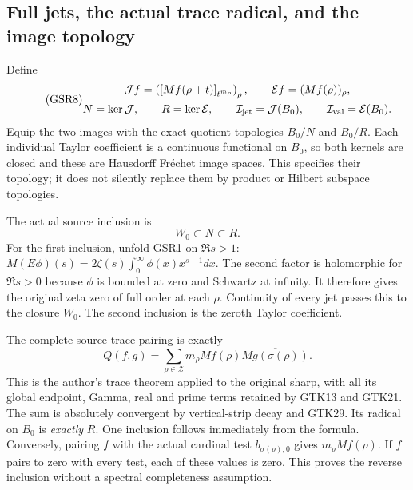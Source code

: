 \subsection{Full jets, the actual trace radical, and the image topology}

Define
\begin{equation}\tag{GSR8}
 \begin{gathered}
 \mathcal Jf=
  \left(\left[Mf(\rho+t)\right]_{t^{m_\rho}}\right)_\rho,
 \qquad
 \mathcal Ef=(Mf(\rho))_\rho,\\
 N=\ker\mathcal J,\qquad R=\ker\mathcal E,\qquad
 \mathcal I_{\rm jet}=\mathcal J(B_0),\qquad
 \mathcal I_{\rm val}=\mathcal E(B_0).
 \end{gathered}
\end{equation}
Equip the two images with the exact quotient
topologies $B_0/N$ and $B_0/R$. Each individual
Taylor coefficient is a continuous functional
on $B_0$, so both kernels are closed and these
are Hausdorff Fréchet image spaces. This
specifies their topology; it does not silently
replace them by product or Hilbert subspace
topologies.

The actual source inclusion is
\begin{equation}\tag{GSR9}
 W_0\subset N\subset R.
\end{equation}
For the first inclusion, unfold GSR1 on $\Re s>1$:
$M(E\phi)(s)=2\zeta(s)\int_0^\infty\phi(x)x^{s-1}dx$.
The second factor is holomorphic for $\Re s>0$
because $\phi$ is bounded at zero and Schwartz
at infinity. It therefore gives the original
zeta zero of full order at each $\rho$.
Continuity of every jet passes this to the
closure $W_0$. The second inclusion is
the zeroth Taylor coefficient.

The complete source trace pairing is exactly
\begin{equation}\tag{GSR10}
 Q(f,g)=\sum_{\rho\in\mathcal Z}
       m_\rho Mf(\rho)\overline{Mg(\sigma(\rho))}.
\end{equation}
This is the author's trace theorem applied to
the original sharp, with all its global
endpoint, Gamma, real and prime terms retained
by GTK13 and GTK21. The sum is absolutely
convergent by vertical-strip decay and GTK29.
Its radical on $B_0$ is \emph{exactly} $R$.
One inclusion follows immediately from the
formula. Conversely, pairing $f$ with the
actual cardinal test $b_{\sigma(\rho),0}$
gives $m_\rho Mf(\rho)$. If $f$ pairs to zero
with every test, each of these values is zero.
This proves the reverse inclusion without a
spectral completeness assumption.

